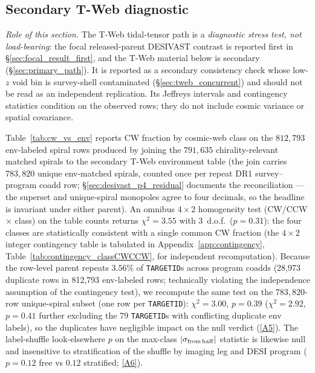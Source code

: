 \documentclass[aps,prd,twocolumn,superscriptaddress,showpacs,preprintnumbers,nofootinbib,longbibliography,floatfix]{revtex4-2}
\newcommand{\repoBase}{https://github.com/Hubify-Projects/bigbounce/blob/main}
\begin{document}
\subsection{Secondary T-Web diagnostic}\label{sec:results_vweb}

\emph{Role of this section.} The T-Web tidal-tensor path is a
\emph{diagnostic stress test, not load-bearing}: the focal released-parent
DESIVAST contrast is reported first in
\S\ref{sec:focal_result_first}, and the T-Web material below is
secondary (\S\ref{sec:primary_path}).
It is reported as a secondary consistency check whose
low-$z$ void bin is survey-shell contaminated (\S\ref{sec:tweb_concurrent})
and should not be read as an independent replication. Its Jeffreys
intervals and contingency statistics condition on the observed rows;
they do not include cosmic variance or spatial covariance.

Table~\ref{tab:cw_vs_env} reports CW fraction by cosmic-web class on
the $812{,}793$ env-labeled spiral rows produced by joining the
$791{,}635$ chirality-relevant matched spirals to the secondary T-Web
environment table (the join carries $783{,}820$ unique env-matched
spirals, counted once per repeat DR1 survey--program coadd row;
\S\ref{sec:desivast_p4_residual} documents the reconciliation — the
superset and unique-spiral monopoles agree to four decimals, so the
headline is invariant under either parent). An omnibus $4\times2$
homogeneity test (CW/CCW $\times$ class) on the table counts returns
$\chi^2 = 3.55$ with 3~d.o.f.\ ($p = 0.31$): the four classes are
statistically consistent with a single common CW fraction (the
$4{\times}2$ integer contingency table is tabulated in
Appendix~\ref{app:contingency}, Table~\ref{tab:contingency_classCWCCW},
for independent recomputation). Because
the row-level parent repeats $3.56\%$ of \texttt{TARGETID}s across program coadds
(28{,}973 duplicate rows in 812{,}793 env-labeled rows; technically violating the independence assumption of
the contingency test), we recompute the same test on the
$783{,}820$-row unique-spiral subset (one row per \texttt{TARGETID}):
$\chi^2 = 3.00$, $p = 0.39$ ($\chi^2 = 2.92$, $p = 0.41$ further
excluding the $79$ \texttt{TARGETID}s with conflicting duplicate env
labels), so the duplicates have negligible impact on the null verdict
(\href{\repoBase/pipelines/p5\_desi\_chirality/outputs/21\_r23conf\_meta\_closures.json}{[A5]}). The
label-shuffle look-elsewhere $p$ on the max-class
$|\sigma_{\rm from\,half}|$ statistic is likewise null and insensitive
to stratification of the shuffle by imaging leg and DESI program
($p = 0.12$ free vs $0.12$ stratified;
\href{\repoBase/pipelines/p5\_desi\_chirality/outputs/18\_v0151\_stratified\_and\_density.json}{[A6]}).
\end{document}
